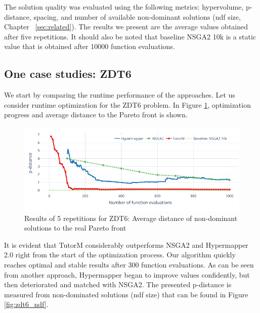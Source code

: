     The solution quality was evaluated using the following metrics: hypervolume, p-distance, spacing, and number of available non-dominant solutions (ndf size, Chapter ~\ref{sec:related}). The results we present are the average values obtained after five repetitions. It should also be noted that baseline NSGA2 10k is a static value that is obtained after 10000 function evaluations.

    \subsection*{One case studies: ZDT6}
    We start by comparing the runtime performance of the approaches. Let us consider runtime optimization for the ZDT6 problem. In Figure \ref{fig:zdt6_dist}, optimization progress and average distance to the Pareto front is shown. 
    
        \begin{figure}[h]
            \centering
            \includegraphics[width=\textwidth]{content/images/zdt6_dist}
            \caption[Results of 5 repetitions for ZDT6: Distance of non-dominant solutions to the real Pareto front]{Results of 5 repetitions for ZDT6: Average distance of non-dominant solutions to the real Pareto front}
            \label{fig:zdt6_dist}
        \end{figure}
        
    It is evident that TutorM considerably outperforms NSGA2 and Hypermapper 2.0 right from the start of the optimization process. Our algorithm quickly reaches optimal and stable results after 300 function evaluations. As can be seen from another approach, Hypermapper began to improve values confidently, but then deteriorated and matched with NSGA2. The presented p-distance is measured from non-dominated solutions (ndf size) that can be found in Figure \ref{fig:zdt6_ndf}. 
    
